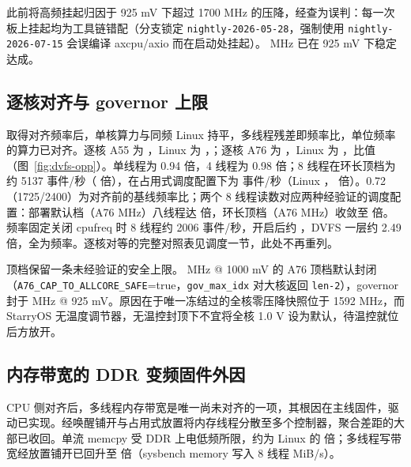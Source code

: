 此前将高频挂起归因于 925 mV 下超过 1700 MHz 的压降，经查为误判：每一次板上挂起均为工具链错配（分支锁定 \texttt{nightly-2026-05-28}，强制使用 \texttt{nightly-2026-07-15} 会误编译 axcpu/axio 而在启动处挂起）。\nDvfsAseven{} MHz 已在 925 mV 下稳定达成。

\subsection{逐核对齐与 governor 上限}

取得对齐频率后，单核算力与同频 Linux 持平，多线程残差即频率比，单位频率的算力已对齐。逐核 A55 为 \nAfive{}，Linux 为 \nAfiveLin{}，；逐核 A76 为 \nAseven{}，Linux 为 \nAsevenLin{}，比值 \nAsevenRatio{}（图~\ref{fig:dvfs-opp}）。单线程为 0.94 倍，4 线程为 0.98 倍；8 线程在环长顶档为约 5137 事件/秒（\nPerCoreRatio{} 倍），在占用式调度配置下为 \nCpuTEight{} 事件/秒（Linux \nCpuTEightLin{}，\nCpuTEightRatio{} 倍）。0.72（1725/2400）为对齐前的基线频率比；两个 8 线程读数对应两种经验证的调度配置：部署默认档（A76 \nDvfsAseven{} MHz）八线程达 \nCpuTEightRatio{} 倍，环长顶档（A76 \nDvfsAsevenTop{} MHz）收敛至 \nPerCoreRatio{} 倍。频率固定关闭 cpufreq 时 8 线程约 2006 事件/秒，开启后约 \nCpuTEight{}，DVFS 一层约 2.49 倍，全为频率。逐核对等的完整对照表见调度一节，此处不再重列。


顶档保留一条未经验证的安全上限。\nDvfsAsevenTop{} MHz @ 1000 mV 的 A76 顶档默认封闭（\texttt{A76\_CAP\_TO\_ALLCORE\_SAFE}=true，\texttt{gov\_max\_idx} 对大核返回 \texttt{len-2}），governor 封于 \nDvfsAseven{} MHz @ 925 mV。原因在于唯一冻结过的全核零压降快照位于 1592 MHz，而 StarryOS 无温度调节器，无温控封顶下不宜将全核 1.0 V 设为默认，待温控就位后方放开。

\subsection{内存带宽的 DDR 变频固件外因}

CPU 侧对齐后，多线程内存带宽是唯一尚未对齐的一项，其根因在主线固件，驱动已实现。经唤醒铺开与占用式放置将内存线程分散至多个控制器，聚合差距的大部已收回。单流 memcpy 受 DDR 上电低频所限，约为 Linux 的 \nMemBWMemcpyRatio{} 倍；多线程写带宽经放置铺开已回升至 \nMemBWWriteRatio{} 倍（sysbench memory 写入 8 线程 \nMemBWWrite{} MiB/s）。

